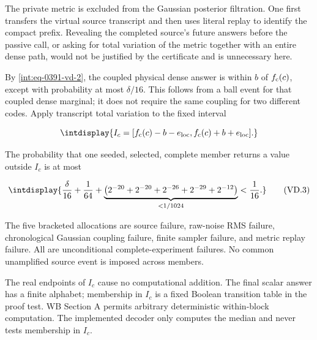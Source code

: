 
The private metric is excluded from the Gaussian posterior filtration. One first transfers the virtual source transcript and then uses literal replay to identify the compact prefix. Revealing the completed source's future answers before the passive call, or asking for total variation of the metric together with an entire dense path, would not be justified by the certificate and is unnecessary here.



By \eqref{int:eq-0391-vd-2}, the coupled physical dense answer is within \(b\) of \(f_{\rm c}(c)\), except with probability at most \(\delta/16\). This follows from a ball event for that coupled dense marginal; it does not require the same coupling for two different codes. Apply transcript total variation to the fixed interval


\begingroup\renewcommand{\theHequation}{intdisplay.807}
\begin{equation*}
\intdisplay{
I_c=[f_{\rm c}(c)-b-e_{\rm loc},
     f_{\rm c}(c)+b+e_{\rm loc}].
}
\end{equation*}
\endgroup


The probability that one seeded, selected, complete member returns a value outside \(I_c\) is at most


\begingroup\renewcommand{\theHequation}{intdisplay.808}
\begin{equation}
\intdisplay{
\frac{\delta}{16}+\frac1{64}
+\underbrace{\left(2^{-20}+2^{-20}
+2^{-26}+2^{-29}+2^{-12}\right)}_{<1/1024}
<\frac1{16}.
}
\tag{VD.3}
\label{int:eq-0392-vd-3}
\end{equation}
\endgroup


The five bracketed allocations are source failure, raw-noise RMS failure, chronological Gaussian coupling failure, finite sampler failure, and metric replay failure. All are unconditional complete-experiment failures. No common unamplified source event is imposed across members.



The real endpoints of \(I_c\) cause no computational addition. The final scalar answer has a finite alphabet; membership in \(I_c\) is a fixed Boolean transition table in the proof test. WB Section A permits arbitrary deterministic within-block computation. The implemented decoder only computes the median and never tests membership in \(I_c\).


